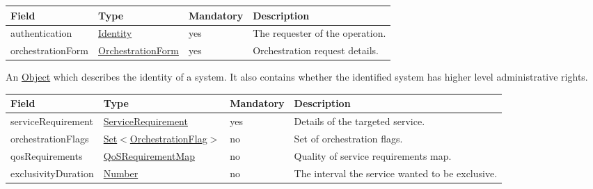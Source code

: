 \documentclass[a4paper]{arrowhead}
\newcommand{\pref}[1]{{\textcolor{ArrowheadGrey}{\hyperref[sec:model:primitives:#1]{#1}}}}
\begin{document}
{}
 
\begin{table}[ht!]
\begin{tabularx}{\textwidth}{| p{3.25cm} | p{3.5cm} | p{2cm} | X |} \hline
\rowcolor{gray!33} Field & Type & Mandatory & Description \\ \hline
authentication & \hyperref[sec:model:Identity]{Identity} & yes & The requester of the operation. \\ \hline
orchestrationForm & \hyperref[sec:model:OrchestrationForm]{OrchestrationForm} & yes & Orchestration request details. \\ \hline
\end{tabularx}
\end{table}


An \pref{Object} which describes the identity of a system. It also contains whether the identified system has higher level administrative rights.


\begin{table}[ht!]
\begin{tabularx}{\textwidth}{| p{3.25cm} | p{3.8cm} | p{2cm} | X |} \hline
\rowcolor{gray!33} Field & Type & Mandatory & Description \\ \hline
serviceRequirement & \hyperref[sec:model:ServiceRequirement]{ServiceRequirement} & yes & Details of the targeted service. \\ \hline
orchestrationFlags & \pref{Set}$<$\hyperref[sec:model:OrchestrationFlag]{OrchestrationFlag}$>$ & no & Set of orchestration flags. \\ \hline
qosRequirements & \hyperref[sec:model:QoSRequirementMap]{QoSRequirementMap} & no & Quality of service requirements map. \\ \hline
exclusivityDuration & \pref{Number} & no & The interval the service wanted to be exclusive.  \\ \hline
\end{tabularx}
\end{table}

\clearpage

\end{document}
